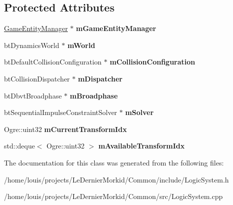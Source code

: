 \subsection*{Protected Attributes}
\begin{DoxyCompactItemize}
\item 
\mbox{\label{class_common_1_1_logic_system_a2bd41b9185b04aa8d0cc243dacf07a30}} 
\hyperlink{class_common_1_1_game_entity_manager}{Game\+Entity\+Manager} $\ast$ {\bfseries m\+Game\+Entity\+Manager}
\item 
\mbox{\label{class_common_1_1_logic_system_a8ff50f813ec112a68298ccf2a44a5a8b}} 
bt\+Dynamics\+World $\ast$ {\bfseries m\+World}
\item 
\mbox{\label{class_common_1_1_logic_system_af317bbd8f5bda6b3516ced4e575da248}} 
bt\+Default\+Collision\+Configuration $\ast$ {\bfseries m\+Collision\+Configuration}
\item 
\mbox{\label{class_common_1_1_logic_system_afab3b81f6dd1a32d91a4b2fbe5153fd9}} 
bt\+Collision\+Dispatcher $\ast$ {\bfseries m\+Dispatcher}
\item 
\mbox{\label{class_common_1_1_logic_system_adf97b2bb9e373e9b81e8b52936c5e8d8}} 
bt\+Dbvt\+Broadphase $\ast$ {\bfseries m\+Broadphase}
\item 
\mbox{\label{class_common_1_1_logic_system_ab9394f7c8ca427c4121e0445f8ae151d}} 
bt\+Sequential\+Impulse\+Constraint\+Solver $\ast$ {\bfseries m\+Solver}
\item 
\mbox{\label{class_common_1_1_logic_system_a86139251209b2eba41382475544fc41b}} 
Ogre\+::uint32 {\bfseries m\+Current\+Transform\+Idx}
\item 
\mbox{\label{class_common_1_1_logic_system_ae196e1204c52d372075ffa8d15a7548a}} 
std\+::deque$<$ Ogre\+::uint32 $>$ {\bfseries m\+Available\+Transform\+Idx}
\end{DoxyCompactItemize}


The documentation for this class was generated from the following files\+:\begin{DoxyCompactItemize}
\item 
/home/louis/projects/\+Le\+Dernier\+Morkid/\+Common/include/Logic\+System.\+h\item 
/home/louis/projects/\+Le\+Dernier\+Morkid/\+Common/src/Logic\+System.\+cpp\end{DoxyCompactItemize}
